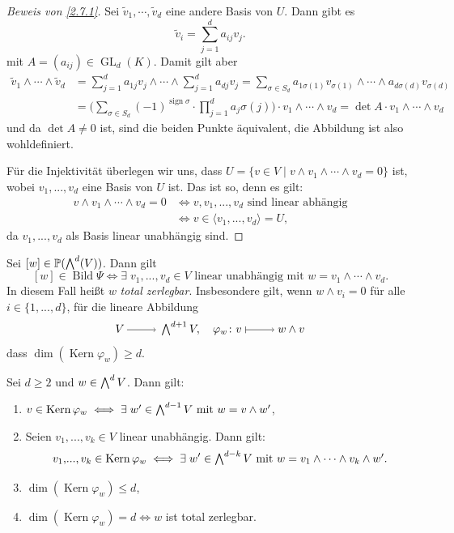 \documentclass[a4paper,12pt]{scrbook}
\theoremstyle{keinenummern} %
\theoremstyle{mitnummern}
\theoremstyle{unserbeweis}
\newtheorem{proof}{Beweis}
\def\P{\mathbb{P}}
\newcommand{\Kern}{\operatorname{Kern}}
\newcommand{\Bild}{\operatorname{Bild}}
\newcommand{\GL}{\operatorname{GL}}
\newcommand{\sign}{\operatorname{sign}}
\renewcommand{\dotsc}{\ensuremath{\!...}}
\let\grassmann\bigwedge
\def\bigwedge{\begingroup\textstyle\grassmann\endgroup}
\newcommand{\ra}{\raisebox{-1pt}{\tikz{\draw[thin,shorten >=3pt, ->] (0,0) node{\hspace*{-2pt}} -- node{} (1,0);}}\penalty1000\relax}
\renewcommand{\mapsto}{\raisebox{-1pt}{\tikz{\draw[thin,shorten >=3pt, |->] (0,0) node{\hspace*{0pt}} -- node{} (1,0);}}\penalty1000\relax}
\begin{document}
\begin{proof}[Beweis von \cref{2.7.1}]
Sei $\tilde{v}_{1},\dotsm,\tilde{v}_{d}$ eine andere Basis von $U$. Dann gibt es
\[\tilde{v}_{i}=\sum_{j=1}^{d}a_{ij}v_{j}.\]
mit $A=(a_{ij})\in\GL_{d}(K)$. Damit gilt aber
\begin{align*}
\tilde{v}_{1}\wedge\dotsm\wedge\tilde{v}_{d}&=\sum_{j=1}^{d}a_{1j}v_{j}\wedge\dotsm\wedge\sum_{j=1}^{d}a_{dj}v_{j}=\sum_{\sigma\in S_{d}}a_{1\sigma(1)}v_{\sigma(1)}\wedge\dotsm\wedge a_{d\sigma(d)}v_{\sigma(d)}\\
&=\biggl(\sum_{\sigma\in S_{d}}(-1)^{\sign\sigma}\cdot\prod_{j=1}^{d}a_{j}\sigma(j)\biggr)\cdot v_{1}\wedge\dotsm\wedge v_{d}=\det A\cdot v_{1}\wedge\dotsm\wedge v_{d}
\end{align*}
und da $\det A\neq 0$ ist, sind die beiden Punkte äquivalent, die Abbildung ist also wohldefiniert.

Für die Injektivität überlegen wir uns, dass $U=\{v\in V\mid v\wedge v_{1}\wedge\dotsm\wedge v_{d}=0\}$ ist, wobei $v_{1},\dotsc, v_{d}$ eine Basis von $U$ ist. Das ist so, denn es gilt:
\begin{align*}
v\wedge v_{1}\wedge\dotsm\wedge v_{d}=0&\iff v,v_{1},\dotsc,v_{d}\text{ sind linear abhängig}\\
&\iff v\in\langle v_{1},\dotsc,v_{d}\rangle=U,
\end{align*}
da $v_{1},\dotsc,v_{d}$ als Basis linear unabhängig sind.
\end{proof}

\begin{db}\label{2.7.2}
Sei $[w]\in\P(\bigwedge^{d}(V))$. Dann gilt
\[[w]\in\Bild\Psi\iff\exists\; v_{1},\dotsc,v_{d}\in V\text{ linear unabhängig mit }w=v_{1}\wedge\dotsm\wedge v_{d}.\]
In diesem Fall heißt $w$ \emph{total zerlegbar}. Insbesondere gilt, wenn $w\wedge v_{i}=0$ für alle $i\in\{1,\dotsc,d\}$, für die lineare Abbildung
\[V\ra\bigwedge^{d+1}V,\quad \varphi_{w}\colon v\mapsto w\wedge v\]
dass $\dim(\Kern\varphi_{w})\geq d$.
\end{db}

\begin{lem}\label{2.7.3}
Sei $d\geq 2$ und $w\in\bigwedge^{d}V$. Dann gilt:
\begin{enumerate}
\item{} $v\in\Kern\varphi_{w}\iff\exists\; w'\in\bigwedge^{d-1}V\text{ mit }w=v\wedge w'$,
\item{} Seien $v_{1},\dotsc,v_{k}\in V$ linear unabhängig. Dann gilt:
\[v_{1},\dotsc,v_{k}\in\Kern\varphi_{w}\iff\exists\; w'\in\bigwedge^{d-k}V\text{ mit }w=v_{1}\wedge\dotsm\wedge v_{k}\wedge w'.\]
\item{} $\dim(\Kern\varphi_{w})\leq d$,
\item{} $\dim(\Kern\varphi_{w})=d\iff w$ ist total zerlegbar.
\end{enumerate}\end{lem}
\end{document}

